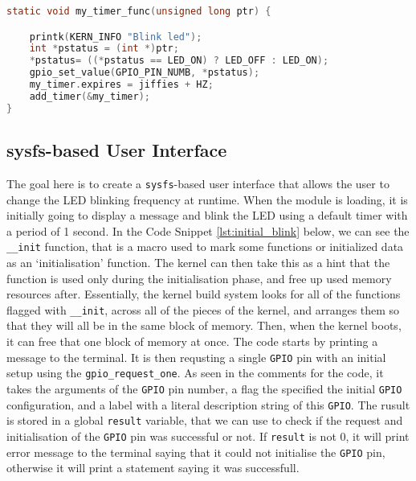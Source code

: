 \documentclass[a4paper,oneside,onecolumn]{article}
\newcommand{\code}[1]{\colorbox{codegray}{\texttt{#1}}}
\begin{document}
\begin{lstlisting}[language=c, label={lst:blink_simple}, caption={Initialisation Function}]
static void my_timer_func(unsigned long ptr) {

    printk(KERN_INFO "Blink led");
    int *pstatus = (int *)ptr;
    *pstatus= ((*pstatus == LED_ON) ? LED_OFF : LED_ON);
    gpio_set_value(GPIO_PIN_NUMB, *pstatus);
    my_timer.expires = jiffies + HZ;
    add_timer(&my_timer);
}
\end{lstlisting}

\subsection{sysfs-based User Interface}

\noindent
The goal here is to create a \texttt{sysfs}-based user interface that allows the user to change the LED blinking frequency at runtime. When the module is loading, it is initially going to display a message and blink the LED using a default timer with a period of 1 second.
\newline
In the Code Snippet \ref{lst:initial_blink} below, we can see the \code{\_\_init} function, that is a macro used to mark some functions or initialized data as an `initialisation' function. The kernel can then take this as a hint that the function is used only during the initialisation phase, and free up used memory resources after. Essentially, the kernel build system looks for all of the functions flagged with \code{\_\_init}, across all of the pieces of the kernel, and arranges them so that they will all be in the same block of memory. Then, when the kernel boots, it can free that one block of memory at once.
\newline
\newline
The code starts by printing a message to the terminal. It is then requsting a single \texttt{GPIO} pin with an initial setup using the \code{gpio\_request\_one}. As seen in the comments for the code, it takes the arguments of the \texttt{GPIO} pin number, a flag the specified the initial \texttt{GPIO} configuration, and a label with a literal description string of this \texttt{GPIO}. The rusult is stored in a global \code{result} variable, that we can use to check if the request and initialisation of the \texttt{GPIO} pin was successful or not. If \code{result} is not 0, it will print error message to the terminal saying that it could not initialise the \texttt{GPIO} pin, otherwise it will print a statement saying it was successfull.
\newline
\end{document}
